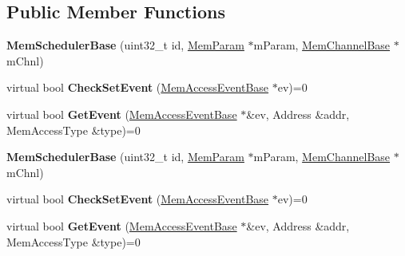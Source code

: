 \subsection*{Public Member Functions}
\begin{DoxyCompactItemize}
\item 
\hypertarget{classMemSchedulerBase_a070bebd70da76419ba0096099c9fe71b}{{\bfseries Mem\-Scheduler\-Base} (uint32\-\_\-t id, \hyperlink{classMemParam}{Mem\-Param} $\ast$m\-Param, \hyperlink{classMemChannelBase}{Mem\-Channel\-Base} $\ast$m\-Chnl)}\label{classMemSchedulerBase_a070bebd70da76419ba0096099c9fe71b}

\item 
\hypertarget{classMemSchedulerBase_a4c2e1b1a58fc99325b084f7cd4b0c501}{virtual bool {\bfseries Check\-Set\-Event} (\hyperlink{classMemAccessEventBase}{Mem\-Access\-Event\-Base} $\ast$ev)=0}\label{classMemSchedulerBase_a4c2e1b1a58fc99325b084f7cd4b0c501}

\item 
\hypertarget{classMemSchedulerBase_a36a062d1c9a452088437e5f712fe13a9}{virtual bool {\bfseries Get\-Event} (\hyperlink{classMemAccessEventBase}{Mem\-Access\-Event\-Base} $\ast$\&ev, Address \&addr, Mem\-Access\-Type \&type)=0}\label{classMemSchedulerBase_a36a062d1c9a452088437e5f712fe13a9}

\item 
\hypertarget{classMemSchedulerBase_a070bebd70da76419ba0096099c9fe71b}{{\bfseries Mem\-Scheduler\-Base} (uint32\-\_\-t id, \hyperlink{classMemParam}{Mem\-Param} $\ast$m\-Param, \hyperlink{classMemChannelBase}{Mem\-Channel\-Base} $\ast$m\-Chnl)}\label{classMemSchedulerBase_a070bebd70da76419ba0096099c9fe71b}

\item 
\hypertarget{classMemSchedulerBase_a4c2e1b1a58fc99325b084f7cd4b0c501}{virtual bool {\bfseries Check\-Set\-Event} (\hyperlink{classMemAccessEventBase}{Mem\-Access\-Event\-Base} $\ast$ev)=0}\label{classMemSchedulerBase_a4c2e1b1a58fc99325b084f7cd4b0c501}

\item 
\hypertarget{classMemSchedulerBase_a36a062d1c9a452088437e5f712fe13a9}{virtual bool {\bfseries Get\-Event} (\hyperlink{classMemAccessEventBase}{Mem\-Access\-Event\-Base} $\ast$\&ev, Address \&addr, Mem\-Access\-Type \&type)=0}\label{classMemSchedulerBase_a36a062d1c9a452088437e5f712fe13a9}

\end{DoxyCompactItemize}
